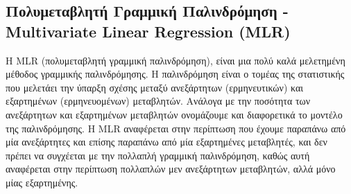 \documentclass[11pt,a4paper,english,greek,twoside]{../Thesis}
\begin{document}
\subsection{Πολυμεταβλητή Γραμμική Παλινδρόμηση - Multivariate Linear Regression (MLR)}
\par Η MLR (πολυμεταβλητή γραμμική παλινδρόμηση), είναι μια πολύ καλά μελετημένη μέθοδος γραμμικής παλινδρόμησης. Η παλινδρόμηση είναι ο τομέας της στατιστικής που μελετάει την ύπαρξη σχέσης μεταξύ ανεξάρτητων (ερμηνευτικών) και εξαρτημένων (ερμηνευομένων) μεταβλητών. Ανάλογα με την ποσότητα των ανεξάρτητων και εξαρτημένων μεταβλητών ονομάζουμε και διαφορετικά το μοντέλο της παλινδρόμησης. H MLR αναφέρεται στην περίπτωση που έχουμε παραπάνω από μία ανεξάρτητες και επίσης παραπάνω από μία εξαρτημένες μεταβλητές, και δεν πρέπει να συγχέεται με την πολλαπλή γραμμική παλινδρόμηση, καθώς αυτή αναφέρεται στην περίπτωση πολλαπλών μεν ανεξάρτητων μεταβλητών, αλλά μόνο μίας εξαρτημένης.
\end{document}
